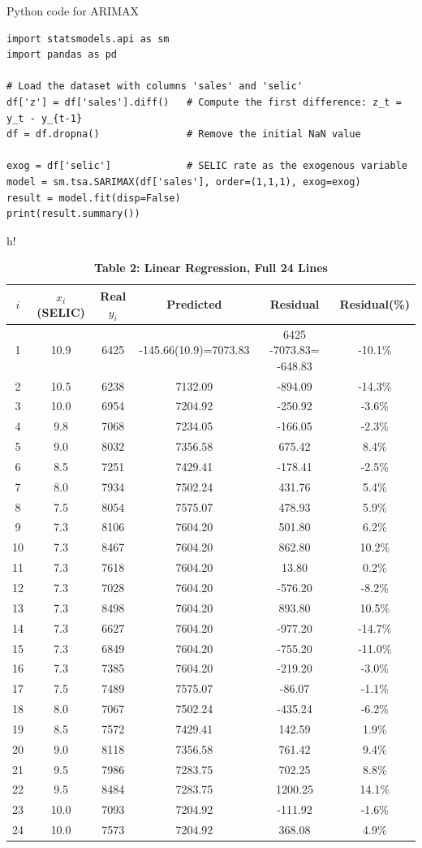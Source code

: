 \documentclass{article}
\begin{document}
\begin{enumerate}
\item 
Python code for ARIMAX 
\begin{verbatim}
import statsmodels.api as sm
import pandas as pd

# Load the dataset with columns 'sales' and 'selic'
df['z'] = df['sales'].diff()   # Compute the first difference: z_t = y_t - y_{t-1}
df = df.dropna()               # Remove the initial NaN value

exog = df['selic']             # SELIC rate as the exogenous variable
model = sm.tsa.SARIMAX(df['sales'], order=(1,1,1), exog=exog)
result = model.fit(disp=False)
print(result.summary())
\end{verbatim}
\begin{table} \item [h!]\centering\caption{\textbf{Table 2: Linear Regression, Full 24 Lines}}
\label{tab:table2_linear_24}
\begin{tabular}{cccccc}
\toprule
$i$ & $x_i$ (SELIC) & Real $y_i$ & Predicted & Residual & Residual(\%) \\
\midrule
1 &10.9 &6425 &\;8661.52 -145.66(10.9)=7073.83 &6425 -7073.83= -648.83 & -10.1\%\\
2 &10.5 &6238 &7132.09 & -894.09 & -14.3\%\\
3 &10.0 &6954 &7204.92 & -250.92 & -3.6\%\\
4 &9.8  &7068 &7234.05 & -166.05 & -2.3\%\\
5 &9.0  &8032 &7356.58 & 675.42 & 8.4\%\\
6 &8.5  &7251 &7429.41 & -178.41 & -2.5\%\\
7 &8.0  &7934 &7502.24 & 431.76 & 5.4\%\\
8 &7.5  &8054 &7575.07 & 478.93 & 5.9\%\\
9 &7.3  &8106 &7604.20 & 501.80 & 6.2\%\\
10&7.3  &8467 &7604.20 & 862.80 & 10.2\%\\
11&7.3  &7618 &7604.20 & 13.80 & 0.2\%\\
12&7.3  &7028 &7604.20 & -576.20 & -8.2\%\\
13&7.3  &8498 &7604.20 & 893.80 & 10.5\%\\
14&7.3  &6627 &7604.20 & -977.20 & -14.7\%\\
15&7.3  &6849 &7604.20 & -755.20 & -11.0\%\\
16&7.3  &7385 &7604.20 & -219.20 & -3.0\%\\
17&7.5  &7489 &7575.07 & -86.07 & -1.1\%\\
18&8.0  &7067 &7502.24 & -435.24 & -6.2\%\\
19&8.5  &7572 &7429.41 & 142.59 & 1.9\%\\
20&9.0  &8118 &7356.58 & 761.42 & 9.4\%\\
21&9.5  &7986 &7283.75 & 702.25 & 8.8\%\\
22&9.5  &8484 &7283.75 &1200.25 &14.1\%\\
23&10.0 &7093 &7204.92 &-111.92 & -1.6\%\\
24&10.0 &7573 &7204.92 & 368.08 & 4.9\%\\
\bottomrule
\end{tabular}
\end{table}


\end{enumerate}
\end{document}
